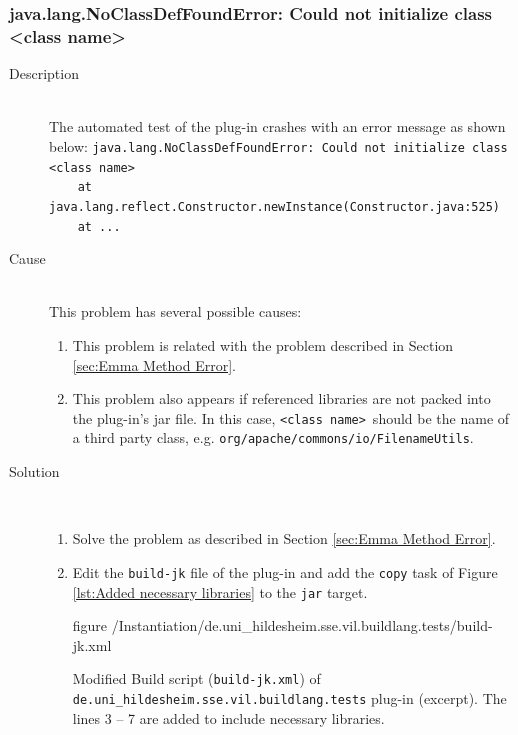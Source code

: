 \subsubsection[java.lang.NoClassDefFoundError]{java.lang.NoClassDefFoundError: Could not initialize class <class name>}
\label{sec:NoClassDefFoundError}
\begin{description}
	\item[Description] $ $\\
		The automated test of the plug-in crashes with an error message as shown below:
		\small
			\verb|java.lang.NoClassDefFoundError: Could not initialize class |\color{red}\verb|<class name>|\\
			\color{black}\verb|    at java.lang.reflect.Constructor.newInstance(Constructor.java:525)|\\
			\verb|    at ...|
		\normalsize
	\item[Cause] $ $\\
	This problem has several possible causes:	
	\begin{enumerate}
		\item This problem is related with the problem described in Section \vref{sec:Emma Method Error}.
		\item This problem also appears if referenced libraries are not packed into the plug-in's jar file. In this case, \color{red}\texttt{<class name>}\color{black}\ should be the name of a third party class, e.g. \texttt{org/apache/commons/io/FilenameUtils}.
	\end{enumerate}
	\item[Solution] $ $
	\begin{enumerate}
		\item Solve the problem as described in Section \ref{sec:Emma Method Error}.
		\item Edit the \texttt{build-jk} file of the plug-in and add the \texttt{copy} task of Figure \vref{lst:Added necessary libraries} to the \texttt{jar} target.
		\begin{nofloat}{figure}
			\centering
			 {\trunkDir/Instantiation/de.uni_hildesheim.sse.vil.buildlang.tests/build-jk.xml}
			\caption[Creation of a jar, including referenced libraries]{Modified Build script (\texttt{build-jk.xml}) of \texttt{de.uni\_hildesheim.sse.vil.build\-lang.tests} plug-in (excerpt). The lines 3 -- 7 are added to include necessary libraries.}
			\label{lst:Added necessary libraries}
\end{nofloat}
	\end{enumerate}
\end{description}